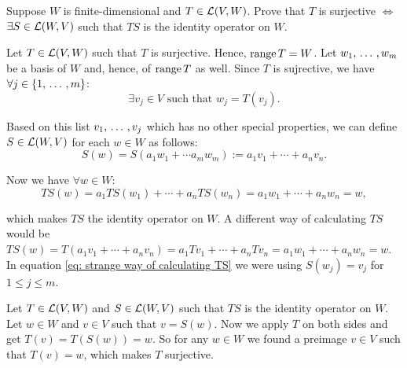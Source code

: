 \begin{xrcs}
  Suppose $W$ is finite-dimensional and $T \in \mathcal{L} (V,W)$. Prove that $T$ is surjective $\iff$ $\exists S \in \mathcal{L} (W,V)$ such that $TS$ is the identity operator on $W$.

  \begin{xprf}
    \Rightarrowdirection Let $T \in \mathcal{L} (V,W)$ such that $T$ is surjective. Hence, $\operatorname{range} T = W$. Let $w_1, {\, \ldots \,\,}, w_m$ be a basis of $W$ and, hence, of $\operatorname{range} T$ as well. Since $T$ is sujrective, we have $\forall j \in \{1, {\, \ldots \,\,}, m\}$:
    \begin{equation}
      \exists v_j \in V \text{ such that } w_j = T(v_j).
    \end{equation}

    Based on this list $v_1, {\, \ldots \,\,}, v_j$ which has no other special properties, we can define $S \in \mathcal{L} (W,V)$ for each $w \in W$ as follows:
    \begin{equation}
      S(w) = S(a_1 w_1 + \cdots a_m w_m) := a_1 v_1 + \cdots + a_n v_n.
    \end{equation}

    Now we have $\forall w \in W$:
    \begin{equation}
      \label{eq: strange way of calculating TS}
      TS(w) = a_1 TS(w_1) + \cdots +a_n TS (w_n) = a_1 w_1 + \cdots + a_n w_n = w,
    \end{equation}

    which makes $TS$ the identity operator on $W$. A different way of calculating $TS$ would be $TS(w) = T(a_1 v_1 + \cdots + a_n v_n) = a_1 T v_1 + \cdots + a_n T v_n = a_1 w_1 + \cdots + a_n w_n = w$. In equation \eqref{eq: strange way of calculating TS} we were using $S(w_j) = v_j$ for $1 \leq j \leq m$.

    \Leftarrowdirection Let $T \in \mathcal{L} (V,W)$ and $S \in \mathcal{L}(W,V)$ such that $TS$ is the identity operator on $W$. Let $w \in W$ and $v \in V$ such that $v=S(w)$. Now we apply $T$ on both sides and get $T(v) = T(S(w)) = w$. So for any $w \in W$ we found a preimage $v \in V$ such that $T(v) = w$, which makes $T$ surjective.
  \end{xprf}
\end{xrcs}


